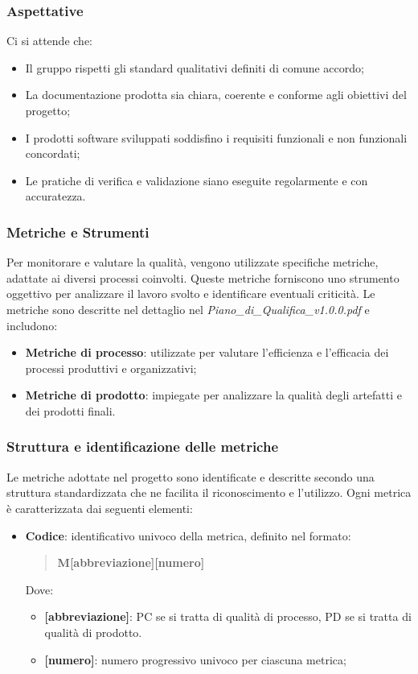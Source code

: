 \documentclass[10pt]{article}
\begin{document}
\begin{justify}
    \subsubsection{Aspettative}
    Ci si attende che:
    \begin{itemize}
        \item Il gruppo rispetti gli standard qualitativi definiti di comune accordo;
        \item La documentazione prodotta sia chiara, coerente e conforme agli obiettivi del progetto;
        \item I prodotti software sviluppati soddisfino i requisiti funzionali e non funzionali concordati;
        \item Le pratiche di verifica e validazione siano eseguite regolarmente e con accuratezza.
    \end{itemize}
    
    \subsubsection{Metriche e Strumenti}
    Per monitorare e valutare la qualità, vengono utilizzate specifiche metriche, adattate ai diversi processi coinvolti. Queste metriche forniscono uno strumento oggettivo per analizzare il lavoro svolto e identificare eventuali criticità. Le metriche sono descritte nel dettaglio nel \textit{Piano\_di\_Qualifica\_v1.0.0.pdf} e includono:
    \begin{itemize}
        \item \textbf{Metriche di processo}: utilizzate per valutare l'efficienza e l'efficacia dei processi produttivi e organizzativi;
        \item \textbf{Metriche di prodotto}: impiegate per analizzare la qualità degli artefatti e dei prodotti finali.
    \end{itemize}
    
    \subsubsection{Struttura e identificazione delle metriche}
    Le metriche adottate nel progetto sono identificate e descritte secondo una struttura standardizzata che ne facilita il riconoscimento e l'utilizzo. Ogni metrica è caratterizzata dai seguenti elementi:
    \begin{itemize}
        \item \textbf{Codice}: identificativo univoco della metrica, definito nel formato:
    \begin{quote}
        \textbf{M[abbreviazione][numero]}
    \end{quote}
    Dove:
    \begin{itemize}
        \item \textbf{[abbreviazione]}: PC se si tratta di qualità di processo, PD se si tratta di qualità di prodotto.
        \item \textbf{[numero]}: numero progressivo univoco per ciascuna metrica;
    \end{itemize}
    

\end{itemize}
\end{justify}
\end{document}
